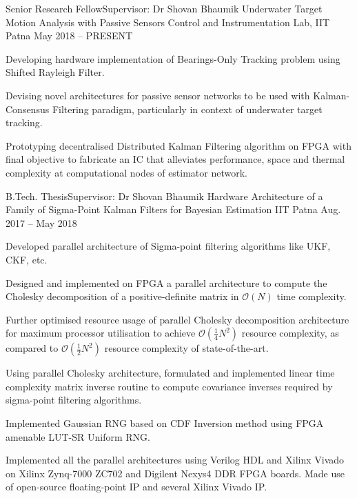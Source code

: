 
\begin{cventries}

\cventry
	{Senior Research Fellow\quad\textbar\quad Supervisor: Dr Shovan Bhaumik} %
	{Underwater Target Motion Analysis with Passive Sensors} %
	{Control and Instrumentation Lab, IIT Patna} %
	{May 2018 -- PRESENT} %
	{\begin{cvitems} %
		\item {Developing hardware implementation of Bearings-Only Tracking problem using Shifted Rayleigh Filter.}
		\item {Devising novel architectures for passive sensor networks to be used with Kalman-Consensus Filtering paradigm, particularly in context of underwater target tracking.}
		\item {Prototyping decentralised Distributed Kalman Filtering algorithm on FPGA with final objective to fabricate an IC that alleviates performance, space and thermal complexity at computational nodes of estimator network.}
	\end{cvitems}}

\cventry
	{B.Tech. Thesis\quad\textbar\quad Supervisor: Dr Shovan Bhaumik} %
	{Hardware Architecture of a Family of Sigma-Point Kalman Filters for Bayesian Estimation} %
	{IIT Patna} %
	{Aug. 2017 -- May 2018} %
	{\begin{cvitems} %
		\item {Developed parallel architecture of Sigma-point filtering algorithms like UKF, CKF, etc.}
		\item {Designed and implemented on FPGA a parallel architecture to compute the Cholesky decomposition of a positive-definite matrix in $\mathcal{O} \left( N \right)$ time complexity.}
		\item {Further optimised resource usage of parallel Cholesky decomposition architecture for maximum processor utilisation to achieve $\mathcal{O} \left( \frac{1}{4} N^2 \right)$ resource complexity, as compared to $\mathcal{O} \left( \frac{1}{2} N^2 \right)$ resource complexity of state-of-the-art.}
		\item {Using parallel Cholesky architecture, formulated and implemented linear time complexity matrix inverse routine to compute covariance inverses required by sigma-point filtering algorithms.}
		\item {Implemented Gaussian RNG based on CDF Inversion method using FPGA amenable LUT-SR Uniform RNG.}
		\item {Implemented all the parallel architectures using Verilog HDL and Xilinx Vivado on Xilinx Zynq-7000 ZC702 and Digilent Nexys4 DDR FPGA boards. Made use of open-source floating-point IP and several Xilinx Vivado IP.}
	\end{cvitems}}

\end{cventries}
